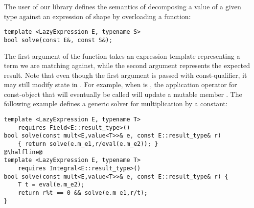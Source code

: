 


The user of our library defines the semantics of decomposing a value of a given 
type  against an expression of shape  by overloading a function: 

\begin{lstlisting}
template <LazyExpression E, typename S> 
bool solve(const E&, const S&);
\end{lstlisting}

\noindent
The first argument of the function takes an expression template representing a 
term we are matching against, while the second argument represents the expected 
result. Note that even though the first argument is passed with const-qualifier, 
it may still modify state in . For example, when  is 
, the application operator for const-object that will eventually be 
called will update a mutable member .
%
The following example defines a generic solver for multiplication by a 
constant:

\begin{lstlisting}
template <LazyExpression E, typename T> 
    requires Field<E::result_type>()
bool solve(const mult<E,value<T>>& e, const E::result_type& r)
    { return solve(e.m_e1,r/eval(e.m_e2)); }
@\halfline@
template <LazyExpression E, typename T>
    requires Integral<E::result_type>()
bool solve(const mult<E,value<T>>& e, const E::result_type& r) {
    T t = eval(e.m_e2);
    return r%t == 0 && solve(e.m_e1,r/t);
}
\end{lstlisting}

